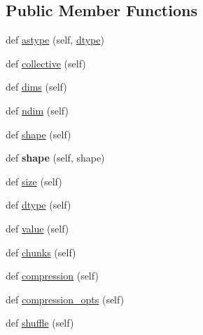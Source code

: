 \subsection*{Public Member Functions}
\begin{DoxyCompactItemize}
\item 
def \hyperlink{classh5py__LOCAL_1_1__hl_1_1dataset_1_1Dataset_ae631af1a42d79200fc28f15e1f966bbc}{astype} (self, \hyperlink{classh5py__LOCAL_1_1__hl_1_1dataset_1_1Dataset_aa5b8786745cb0e1a0027a5268c67b497}{dtype})
\item 
def \hyperlink{classh5py__LOCAL_1_1__hl_1_1dataset_1_1Dataset_aa35cb8feb8765c816d69b25bbc754238}{collective} (self)
\item 
def \hyperlink{classh5py__LOCAL_1_1__hl_1_1dataset_1_1Dataset_ac73276cdfe271b212db2f48161ec4e3c}{dims} (self)
\item 
def \hyperlink{classh5py__LOCAL_1_1__hl_1_1dataset_1_1Dataset_ab7293c38e437f8cb34c0b9dbdb32d2f1}{ndim} (self)
\item 
def \hyperlink{classh5py__LOCAL_1_1__hl_1_1dataset_1_1Dataset_a561726a997e3a5b828e1665003c4cd9b}{shape} (self)
\item 
\mbox{\label{classh5py__LOCAL_1_1__hl_1_1dataset_1_1Dataset_aa87e02c0c024bac6a7527953022c0fd4}} 
def {\bfseries shape} (self, shape)
\item 
def \hyperlink{classh5py__LOCAL_1_1__hl_1_1dataset_1_1Dataset_abab8b512c27f8a2ffb310aaf45868ac3}{size} (self)
\item 
def \hyperlink{classh5py__LOCAL_1_1__hl_1_1dataset_1_1Dataset_aa5b8786745cb0e1a0027a5268c67b497}{dtype} (self)
\item 
def \hyperlink{classh5py__LOCAL_1_1__hl_1_1dataset_1_1Dataset_a482c0a49e79c0f6dd7a4359ba5be0d07}{value} (self)
\item 
def \hyperlink{classh5py__LOCAL_1_1__hl_1_1dataset_1_1Dataset_aea39c846568fef792ccd71297386fa3e}{chunks} (self)
\item 
def \hyperlink{classh5py__LOCAL_1_1__hl_1_1dataset_1_1Dataset_ada2054a0c6b6740f8aea80835843cc15}{compression} (self)
\item 
def \hyperlink{classh5py__LOCAL_1_1__hl_1_1dataset_1_1Dataset_ac72a63add854a1bb2341c84d83e02b20}{compression\+\_\+opts} (self)
\item 
def \hyperlink{classh5py__LOCAL_1_1__hl_1_1dataset_1_1Dataset_a2287ac1bf4c6dd9a8b637491e04bb2ea}{shuffle} (self)
\item 

\end{DoxyCompactItemize}
